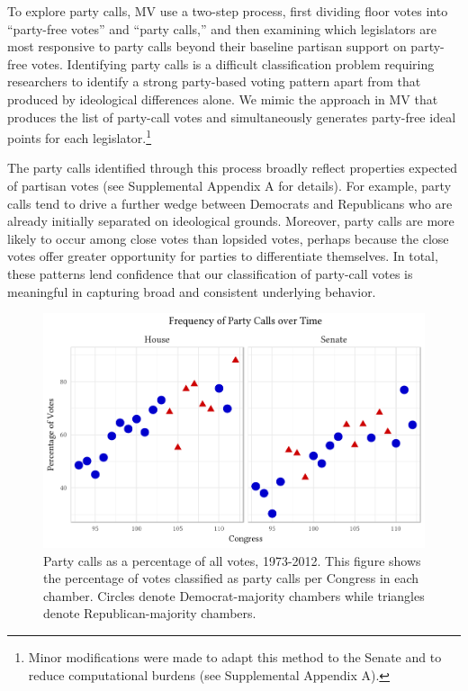 \documentclass[12pt]{article}
\begin{document}
To explore party calls, MV use a two-step process, first dividing floor votes into ``party-free votes'' and ``party calls,'' and then examining which legislators are most responsive to party calls beyond their baseline partisan support on party-free votes.  Identifying party calls is a difficult classification problem requiring researchers to identify a strong party-based voting pattern apart from that produced by ideological differences alone.  We mimic the approach in MV that produces the list of party-call votes and simultaneously generates party-free ideal points for each legislator.\footnote{\doublespacing\normalsize Minor modifications were made to adapt this method to the Senate and to reduce computational burdens (see Supplemental Appendix A).}

The party calls identified through this process broadly reflect properties expected of partisan votes (see Supplemental Appendix A for details).  For example, party calls tend to drive a further wedge between Democrats and Republicans who are already initially separated on ideological grounds.  Moreover, party calls are more likely to occur among close votes than lopsided votes, perhaps because the close votes offer greater opportunity for parties to differentiate themselves.  In total, these patterns lend confidence that our classification of party-call votes is meaningful in capturing broad and consistent underlying behavior.

\begin{figure}[t]
\centering
\includegraphics{party-calls-over-time.pdf}
\caption{Party calls as a percentage of all votes, 1973-2012.
This figure shows the percentage of votes classified as party calls per Congress in each chamber. Circles denote Democrat-majority chambers while triangles denote Republican-majority chambers.
\label{fig-party-calls-over-time}}
\end{figure}
\end{document}
